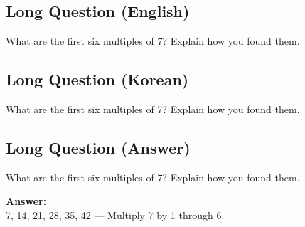\cleardoublepage
\subsection*{Long Question (English)}
What are the first six multiples of 7? Explain how you found them.


\newpage
\subsection*{Long Question (Korean)}
What are the first six multiples of 7? Explain how you found them.


\newpage
\subsection*{Long Question (Answer)}
What are the first six multiples of 7? Explain how you found them.

\textbf{Answer:}\\
7, 14, 21, 28, 35, 42 — Multiply 7 by 1 through 6.
